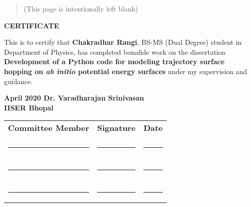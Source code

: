    \newpage
    \thispagestyle{empty}
    \mbox{}
    \vspace*{\fill} 
    \begin{quote} 
    \centering 
    (This page is intentionally left blank)
    \end{quote}
    \vspace*{\fill}
    \setcounter{page}{0}
    \newpage
    \thispagestyle{certificate}
    
    \vspace*{1cm}
    \begin{center}
        \LARGE{\textbf{\uppercase{Certificate}}}\label{certificate}
    \end{center}
    \vspace{2cm}
    This is to certify that \textbf{Chakradhar Rangi}, BS-MS (Dual Degree) student in Department of Physics, has completed bonafide work on the dissertation \textbf{Development of a Python code for modeling trajectory surface hopping on \textit{ab initio} potential energy surfaces} under my supervision and guidance.
    \vfill

    \noindent\textbf{April 2020 \hfill Dr. Varadharajan Srinivasan
    \\ IISER Bhopal}

    \vfill
    
    \begin{center}
        \begin{tabular}{ccc}
            \textbf{Committee Member} & \textbf{Signature} & \textbf{Date} \\
            \\
            \rule{15em}{0.4pt} & \rule{10em}{0.4pt} & \rule{6em}{0.4pt} \\
            \\
            \rule{15em}{0.4pt} & \rule{10em}{0.4pt} & \rule{6em}{0.4pt} \\
            \\
            \rule{15em}{0.4pt} & \rule{10em}{0.4pt} & \rule{6em}{0.4pt} \\
        \end{tabular}
    \end{center}
    
